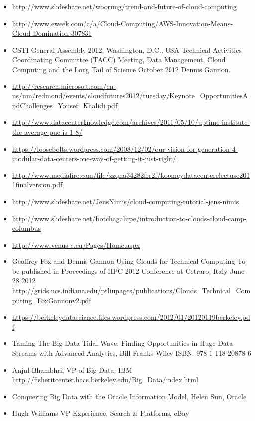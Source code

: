 \begin{itemize}
\item
  \url{http://www.slideshare.net/woorung/trend-and-future-of-cloud-computing}
\item
  \url{http://www.eweek.com/c/a/Cloud-Computing/AWS-Innovation-Means-Cloud-Domination-307831}
\item
  CSTI General Assembly 2012, Washington, D.C., USA Technical Activities
  Coordinating Committee (TACC) Meeting, Data Management, Cloud
  Computing and the Long Tail of Science October 2012 Dennis Gannon.
\item
  \url{http://research.microsoft.com/en-us/um/redmond/events/cloudfutures2012/tuesday/Keynote_OpportunitiesAndChallenges_Yousef_Khalidi.pdf}
\item
  \url{http://www.datacenterknowledge.com/archives/2011/05/10/uptime-institute-the-average-pue-is-1-8/}
\item
  \url{https://loosebolts.wordpress.com/2008/12/02/our-vision-for-generation-4-modular-data-centers-one-way-of-getting-it-just-right/}
\item
  \url{http://www.mediafire.com/file/zzqna34282frr2f/koomeydatacenterelectuse2011finalversion.pdf}
\item
  \url{http://www.slideshare.net/JensNimis/cloud-computing-tutorial-jens-nimis}
\item
  \url{http://www.slideshare.net/botchagalupe/introduction-to-clouds-cloud-camp-columbus}
\item
  \url{http://www.venus-c.eu/Pages/Home.aspx}
\item
  Geoffrey Fox and Dennis Gannon Using Clouds for Technical Computing To
  be published in Proceedings of HPC 2012 Conference at Cetraro, Italy
  June 28 2012
  \url{http://grids.ucs.indiana.edu/ptliupages/publications/Clouds_Technical_Computing_FoxGannonv2.pdf}
\item
  \url{https://berkeleydatascience.files.wordpress.com/2012/01/20120119berkeley.pdf}
\item
  Taming The Big Data Tidal Wave: Finding Opportunities in Huge Data
  Streams with Advanced Analytics, Bill Franks Wiley ISBN:
  978-1-118-20878-6
\item
  Anjul Bhambhri, VP of Big Data, IBM
  \url{http://fisheritcenter.haas.berkeley.edu/Big_Data/index.html}
\item
  Conquering Big Data with the Oracle Information Model, Helen Sun,
  Oracle
\item
  Hugh Williams VP Experience, Search \& Platforms, eBay

\end{itemize}
